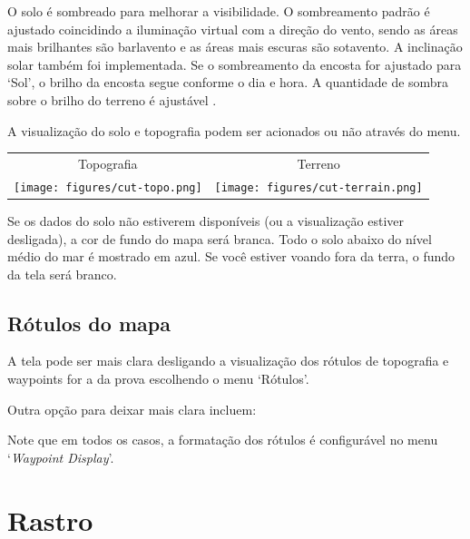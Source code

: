 O solo é sombreado para melhorar a visibilidade.  O sombreamento padrão é ajustado coincidindo a iluminação virtual com a direção do vento, sendo as áreas mais brilhantes são barlavento e as áreas mais escuras são sotavento.   
A inclinação solar também foi implementada.  Se o sombreamento da encosta for ajustado para ‘Sol’, o brilho da encosta segue conforme o dia e hora.  A quantidade de sombra sobre o brilho do terreno é ajustável .

A visualização do solo e topografia podem ser acionados ou não através do menu.

\begin{tabular}{c c}
Topografia & Terreno \\
\texttt{[image: figures/cut-topo.png]} &
\texttt{[image: figures/cut-terrain.png]} \\
\end{tabular}

Se os dados do solo não estiverem disponíveis (ou a visualização estiver desligada), a cor de fundo do mapa será branca.  Todo o solo abaixo do nível médio do mar é mostrado em azul.  Se você estiver voando fora da terra, o fundo da tela será branco.  

\subsection*{Rótulos do mapa}\label{sec:maplabels}

A tela pode ser mais clara desligando a visualização dos rótulos de topografia e waypoints for a da prova escolhendo o menu ‘Rótulos’.

Outra opção para deixar mais clara incluem:



Note que em todos os casos, a formatação dos rótulos é configurável no menu
`{\it Waypoint Display}'.  


\section{Rastro}\label{sec:trail}


